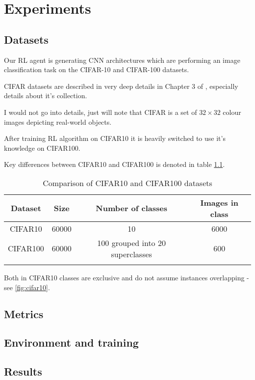 \chapter{Experiments}

\section{Datasets}

Our RL agent is generating CNN architectures which are performing an image classification task on the CIFAR-10 and CIFAR-100 datasets.

CIFAR datasets are described in very deep details in Chapter 3 of \cite{CIFAR}, especially details about it's collection.

I would not go into details, just will note that CIFAR is a set of $32\times 32$ colour images depicting real-world objects.

After training RL algorithm on CIFAR10 it is heavily switched to use it's knowledge on CIFAR100.

Key differences between CIFAR10 and CIFAR100 is denoted in table \ref{table:1}.

\begin{table}[h!]
\centering
\begin{tabular}{c c c c} 
 \hline
 Dataset & Size & Number of classes & Images in class \\ [0.5ex] 
 \hline
 CIFAR10 & 60000 & 10 & 6000 \\
 \hline
 CIFAR100 & 60000 & 100 grouped into 20 superclasses & 600 \\
 \hline \\ [0.5ex]
\end{tabular}
\caption{Comparison of CIFAR10 and CIFAR100 datasets}
\label{table:1}
\end{table}

Both in CIFAR10 classes are exclusive and do not assume instances overlapping - see \ref{fig:cifar10}.




\section{Metrics}
\section{Environment and training}
\section{Results}
